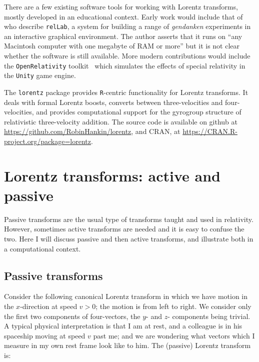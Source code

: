 \documentclass[ijoc,nonblindrev]{informs3} %
\begin{document}
There are a few existing software tools for working with Lorentz
transforms, mostly developed in an educational context.  Early work
would include that of \citet{horwitz1992} who describe {\tt relLab}, a
system for building a range of {\em gendanken} experiments in an
interactive graphical environment.  The author asserts that it runs on
``any Macintosh computer with one megabyte of RAM or more'' but it is
not clear whether the software is still available.  More modern
contributions would include the {\tt OpenRelativity}
toolkit~\citep{sherin2016} which simulates the effects of special
relativity in the {\tt Unity} game engine.

The {\tt lorentz} package provides {\tt R}-centric functionality for
Lorentz transforms.  It deals with formal Lorentz boosts, converts
between three-velocities and four-velocities, and provides
computational support for the gyrogroup structure of relativistic
three-velocity addition.  The source code is available on github at
\url{https://github.com/RobinHankin/lorentz}, and CRAN, at
\url{https://CRAN.R-project.org/package=lorentz}.



\section{Lorentz transforms: active and passive}

Passive transforms are the usual type of transforms taught and used in
relativity.  However, sometimes active transforms are needed and it is
easy to confuse the two.  Here I will discuss passive and then active
transforms, and illustrate both in a computational context.

\subsection*{Passive transforms}

\newcommand{\vvec}[2]{\begin{pmatrix}#1 \\ #2\end{pmatrix}}
\newcommand{\twomat}[4]{\begin{pmatrix} #1 & #2 \\ #3 &
    #4\end{pmatrix}}

Consider the following canonical Lorentz transform in which we have
motion in the $x$-direction at speed $v>0$; the motion is from left to
right.  We consider only the first two components of four-vectors, the
$y$- and $z$- components being trivial.  A typical physical
interpretation is that I am at rest, and a colleague is in his
spaceship moving at speed $v$ past me; and we are wondering what
vectors which I measure in my own rest frame look like to him.  The
(passive) Lorentz transform is:
\end{document}
